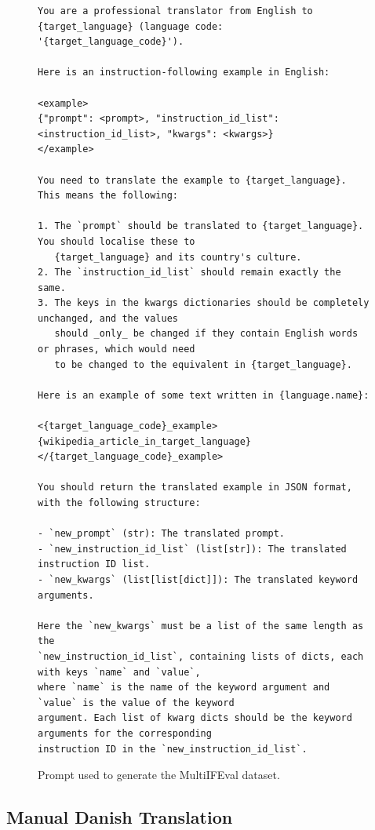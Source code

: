 \documentclass[11pt]{article}
\begin{document}
\begin{figure}[h]
\centering
\small
\begin{verbatim}
You are a professional translator from English to {target_language} (language code:
'{target_language_code}').

Here is an instruction-following example in English:

<example>
{"prompt": <prompt>, "instruction_id_list": <instruction_id_list>, "kwargs": <kwargs>}
</example>

You need to translate the example to {target_language}. This means the following:

1. The `prompt` should be translated to {target_language}. You should localise these to
   {target_language} and its country's culture.
2. The `instruction_id_list` should remain exactly the same.
3. The keys in the kwargs dictionaries should be completely unchanged, and the values
   should _only_ be changed if they contain English words or phrases, which would need
   to be changed to the equivalent in {target_language}.

Here is an example of some text written in {language.name}:

<{target_language_code}_example>
{wikipedia_article_in_target_language}
</{target_language_code}_example>

You should return the translated example in JSON format, with the following structure:

- `new_prompt` (str): The translated prompt.
- `new_instruction_id_list` (list[str]): The translated instruction ID list.
- `new_kwargs` (list[list[dict]]): The translated keyword arguments.

Here the `new_kwargs` must be a list of the same length as the
`new_instruction_id_list`, containing lists of dicts, each with keys `name` and `value`,
where `name` is the name of the keyword argument and `value` is the value of the keyword
argument. Each list of kwarg dicts should be the keyword arguments for the corresponding
instruction ID in the `new_instruction_id_list`.
\end{verbatim}
\caption{Prompt used to generate the MultiIFEval dataset.}
\label{fig:prompt}
\end{figure}


\subsection{Manual Danish Translation}
\label{sec:manual-danish-translation}
\end{document}
